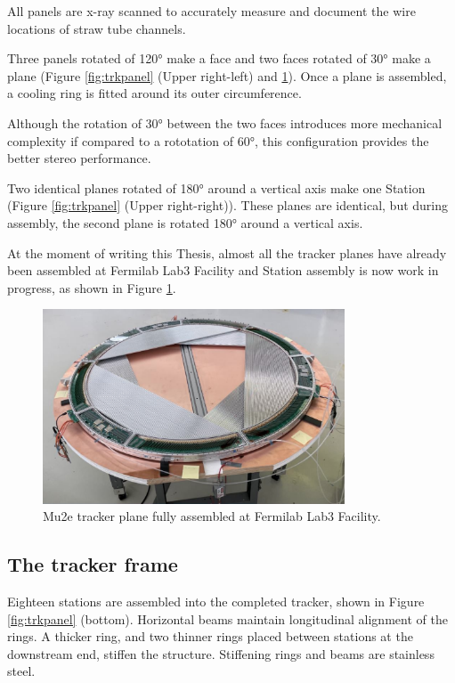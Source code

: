 All panels are x-ray scanned 
to accurately measure and document the wire 
locations of straw tube channels. 

Three panels rotated of 120° make a face and two faces rotated of 30° make a plane (Figure \ref{fig:trkpanel} 
(Upper right-left) and \ref{fig:trueplane}).
Once a plane is assembled, a cooling ring is fitted around its outer circumference. 

Although the rotation of 30° between the two faces introduces more mechanical complexity if 
compared to a rototation of 60°, this configuration provides the better stereo performance. 

Two identical planes rotated of 180° around a vertical axis make one Station 
(Figure \ref{fig:trkpanel} (Upper right-right)). 
These planes are identical, but during assembly, the second plane 
is rotated 180° around a vertical axis. 

At the moment of writing this Thesis, almost all the tracker planes have 
already been assembled at Fermilab Lab3 Facility and Station assembly is now work in progress, 
as shown in Figure \ref{fig:trueplane}.

\begin{figure}[!h]
    \centering
    \includegraphics[width =0.8\textwidth]{figures/png/Screenshot_20240706_163056.png}
    \caption{Mu2e tracker plane fully assembled at Fermilab Lab3 Facility.}
    \label{fig:trueplane}
\end{figure}
\subsection{The tracker frame}

Eighteen stations are assembled into the completed tracker, shown in Figure \ref{fig:trkpanel} 
(bottom). Horizontal beams maintain longitudinal alignment of the rings. 
A thicker ring, and two thinner rings placed between 
stations at the downstream end, stiffen the structure. 
Stiffening rings and beams are stainless steel.

